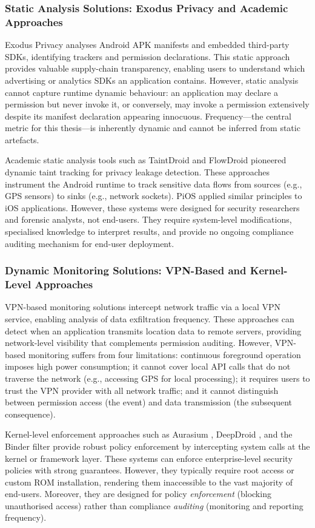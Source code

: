 \subsubsection{Static Analysis Solutions: Exodus Privacy and Academic Approaches}
Exodus Privacy analyses Android APK manifests and embedded third-party SDKs, identifying trackers and permission declarations. This static approach provides valuable supply-chain transparency, enabling users to understand which advertising or analytics SDKs an application contains. However, static analysis cannot capture runtime dynamic behaviour: an application may declare a permission but never invoke it, or conversely, may invoke a permission extensively despite its manifest declaration appearing innocuous. Frequency—the central metric for this thesis—is inherently dynamic and cannot be inferred from static artefacts.

Academic static analysis tools such as TaintDroid \cite{49} and FlowDroid pioneered dynamic taint tracking for privacy leakage detection. These approaches instrument the Android runtime to track sensitive data flows from sources (e.g., GPS sensors) to sinks (e.g., network sockets). PiOS \cite{49} applied similar principles to iOS applications. However, these systems were designed for security researchers and forensic analysts, not end-users. They require system-level modifications, specialised knowledge to interpret results, and provide no ongoing compliance auditing mechanism for end-user deployment.

\subsubsection{Dynamic Monitoring Solutions: VPN-Based and Kernel-Level Approaches}
VPN-based monitoring solutions intercept network traffic via a local VPN service, enabling analysis of data exfiltration frequency. These approaches can detect when an application transmits location data to remote servers, providing network-level visibility that complements permission auditing. However, VPN-based monitoring suffers from four limitations: continuous foreground operation imposes high power consumption; it cannot cover local API calls that do not traverse the network (e.g., accessing GPS for local processing); it requires users to trust the VPN provider with all network traffic; and it cannot distinguish between permission access (the event) and data transmission (the subsequent consequence).

Kernel-level enforcement approaches such as Aurasium \cite{42}, DeepDroid \cite{44}, and the Binder filter \cite{45} provide robust policy enforcement by intercepting system calls at the kernel or framework layer. These systems can enforce enterprise-level security policies with strong guarantees. However, they typically require root access or custom ROM installation, rendering them inaccessible to the vast majority of end-users. Moreover, they are designed for policy \emph{enforcement} (blocking unauthorised access) rather than compliance \emph{auditing} (monitoring and reporting frequency).

